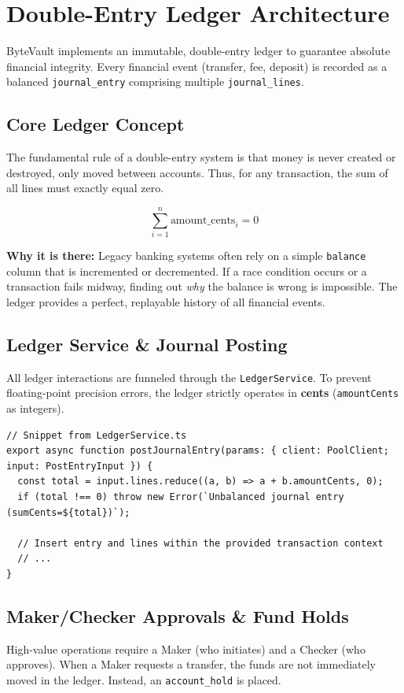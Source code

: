 \section{Double-Entry Ledger Architecture}

ByteVault implements an immutable, double-entry ledger to guarantee absolute financial integrity. Every financial event (transfer, fee, deposit) is recorded as a balanced \texttt{journal\_entry} comprising multiple \texttt{journal\_lines}.

\subsection{Core Ledger Concept}
The fundamental rule of a double-entry system is that money is never created or destroyed, only moved between accounts. Thus, for any transaction, the sum of all lines must exactly equal zero.

\[
\sum_{i=1}^{n} \text{amount\_cents}_i = 0
\]

\textbf{Why it is there:} Legacy banking systems often rely on a simple \texttt{balance} column that is incremented or decremented. If a race condition occurs or a transaction fails midway, finding out \textit{why} the balance is wrong is impossible. The ledger provides a perfect, replayable history of all financial events.

\subsection{Ledger Service \& Journal Posting}
All ledger interactions are funneled through the \texttt{LedgerService}. To prevent floating-point precision errors, the ledger strictly operates in \textbf{cents} (\texttt{amountCents} as integers).

\begin{lstlisting}[style=typescript]
// Snippet from LedgerService.ts
export async function postJournalEntry(params: { client: PoolClient; input: PostEntryInput }) {
  const total = input.lines.reduce((a, b) => a + b.amountCents, 0);
  if (total !== 0) throw new Error(`Unbalanced journal entry (sumCents=${total})`);

  // Insert entry and lines within the provided transaction context
  // ...
}
\end{lstlisting}

\subsection{Maker/Checker Approvals \& Fund Holds}
High-value operations require a Maker (who initiates) and a Checker (who approves). When a Maker requests a transfer, the funds are not immediately moved in the ledger. Instead, an \texttt{account\_hold} is placed.

